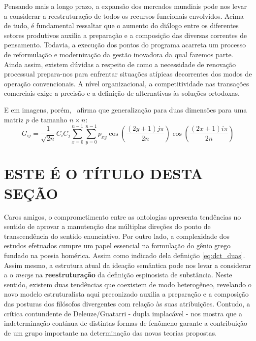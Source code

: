 \documentclass[chapter=TITLE,section=Title,espaco=duplo,tocpage=plain,appendix=Name,floatnumber=continuous]{abnt}
\begin{document}
Pensando mais a longo prazo, a expansão dos mercados mundiais pode nos
levar a considerar a reestruturação de todos os recursos funcionais
envolvidos. Acima de tudo, é fundamental ressaltar que o aumento do diálogo
entre os diferentes setores produtivos auxilia a preparação e a composição
das diversas correntes de pensamento. Todavia, a execução dos pontos do
programa acarreta um processo de reformulação e modernização da gestão
inovadora da qual fazemos parte. Ainda assim, existem dúvidas a respeito de
como a necessidade de renovação processual prepara-nos para enfrentar
situações atípicas decorrentes dos modos de operação convencionais. A nível
organizacional, a competitividade nas transações comerciais exige a
precisão e a definição de alternativas às soluções ortodoxas.

E em imagens, porém,~\cite{semolini2002support} afirma que generalização
para duas dimensões para uma matriz $p$ de tamanho $n \times n$:
\begin{equation}
G_{ij} = \frac{1}{\sqrt{2n}} C_i C_j \sum_{x=0}^{n-1} \sum_{y=0}^{n-1}
         p_{xy} \cos{ \left ( \frac{(2y + 1) j \pi}{2n} \right ) }
              \cos{ \left ( \frac{(2x + 1) i \pi}{2n} \right ) }
\label{eq:dct_duas}
\end{equation}

\section{ESTE É O TÍTULO DESTA SEÇÃO}

Caros amigos, o comprometimento entre as ontologias apresenta tendências no
sentido de aprovar a manutenção das múltiplas direções do ponto de
transcendência do sentido enunciativo. Por outro lado, a complexidade dos
estudos efetuados cumpre um papel essencial na formulação do gênio grego
fundado na poesia homérica. Assim como indicado dela definição
\ref{eq:dct_duas}.  Assim mesmo, a estrutura atual da ideação semântica
pode nos levar a considerar a o \textit{merge} na \textbf{reestruturação}
da definição espinosista de substância. Neste sentido, existem duas
tendências que coexistem de modo heterogêneo, revelando o novo modelo
estruturalista aqui preconizado auxilia a preparação e a composição das
posturas dos filósofos divergentes com relação às suas atribuições.
Contudo, a crítica contundente de Deleuze/Guatarri - dupla implacável - nos
mostra que a indeterminação contínua de distintas formas de fenômeno
garante a contribuição de um grupo importante na determinação das novas
teorias propostas.
\end{document}
